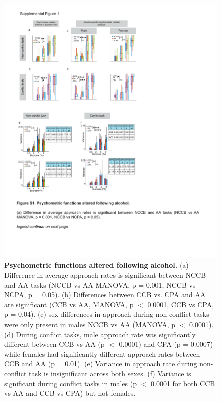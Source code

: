 \documentclass{article}
\newcounter{suppfig}
\renewcommand{\thesuppfig}{S\arabic{suppfig}}  %
\newenvironment{suppfigure}[1][htbp]
  {\refstepcounter{suppfig}%
   \begin{figure}[#1]%
   \renewcommand{\thefigure}{\thesuppfig}}%
  {\end{figure}}
\begin{document}
\begin{suppfigure}
  \centering
  \includegraphics[width=\textwidth, trim=50 100 50 100]{Figs/Alcohol_SI_1.pdf}
  \caption{\textbf{Psychometric functions altered following alcohol.} (a) Difference in average approach rates is significant between NCCB and AA tasks (NCCB vs AA MANOVA, p = 0.001, NCCB vs NCPA, p = 0.05). (b) Differences between CCB vs. CPA and AA are significant (CCB vs AA, MANOVA, p $<$ 0.0001, CCB vs CPA, p = 0.04). (c) sex differences in approach during non-conflict tasks were only present in males NCCB vs AA (MANOVA, p $<$ 0.0001). (d) During conflict tasks, male approach rate was significantly different between CCB vs AA (p $<$ 0.0001) and CPA (p = 0.0007) while females had significantly different approach rates between CCB and AA (p = 0.01). (e) Variance in approach rate during non-conflict task is insignificant across both sexes. (f) Variance is significant during conflict tasks in males (p $<$ 0.0001 for both CCB vs AA and CCB vs CPA) but not females.}
  \label{fig:Alcohol_SI_1}
\end{suppfigure}
\end{document}
